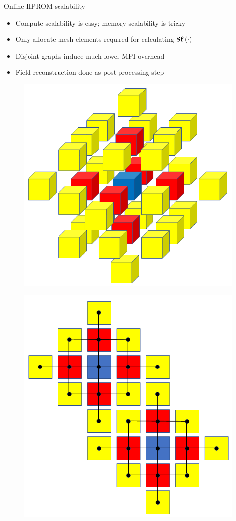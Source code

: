 \documentclass[]{beamer}
\begin{document}
\begin{frame}{Online HPROM scalability}
	\begin{itemize}
		\item Compute scalability is easy; memory scalability is tricky
		\item Only allocate mesh elements required for calculating $\mathbf{S} \mathbf{f} \left(\cdot\right)$
		\item Disjoint graphs induce much lower MPI overhead
		\item Field reconstruction done as post-processing step
	\end{itemize}
	\begin{minipage}{0.49\linewidth}
		\begin{figure}
			\includegraphics[width=0.8\linewidth]{theory/sampling_3d_2ndOrder.png}
		\end{figure}
	\end{minipage}
	\begin{minipage}{0.49\linewidth}
		\begin{figure}
			\includegraphics[width=0.8\linewidth]{theory/load_balancing_withEdgeCuts_noSyms.png}
		\end{figure}
	\end{minipage}
\end{frame}
\end{document}
